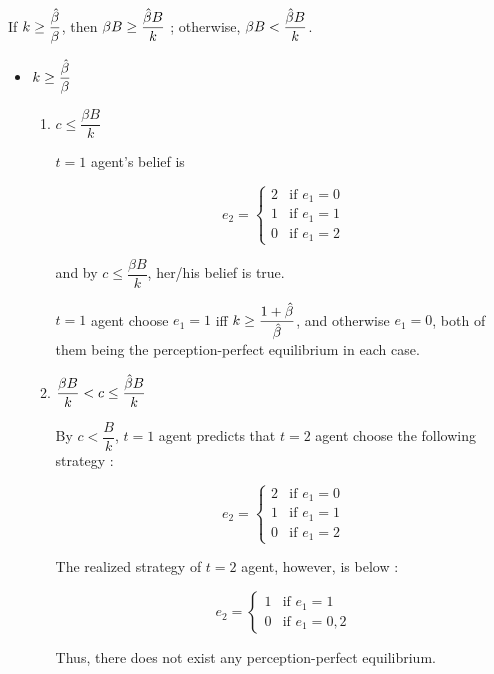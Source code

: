 \documentclass{jsarticle}
\begin{document}
\begin{enumerate}
\begin{enumerate}
\begin{center}
\end{center}

\vspace{1zw}

If $k \geq \dfrac{\Hat{\beta}}{\beta}$, then $\beta B \geq \dfrac{\Hat{\beta}B}{k}$ ; otherwise, $\beta B < \dfrac{\Hat{\beta}B}{k}$.

\newpage

 \begin{itemize}
 
 \item $k \geq \dfrac{\Hat{\beta}}{\beta}$
 
  \begin{enumerate}
  
  \item $c \leq \dfrac{\beta B}{k}$
  
 $t=1$ agent's belief is
 
 \[e_2 = \begin{cases}
 2 & \text{if } e_1=0 \\
 1 & \text{if } e_1=1 \\
 0 & \text{if } e_1=2
 \end{cases} \]
 
 and by $c \leq \dfrac{\beta B}{k}$, her/his belief is true.
 
 $t=1$ agent choose $e_1=1$ iff $ k \geq \dfrac{1+\Hat{\beta}}{\Hat{\beta}}$, and otherwise $e_1=0$, both of them being the perception-perfect equilibrium in each case.
  
  \item $\dfrac{\beta B}{k} < c \leq \dfrac{\Hat{\beta}B}{k}$
  
  By $c < \dfrac{B}{k}$, $t=1$ agent predicts that $t=2$ agent choose the following strategy :
 
 \[e_2 = \begin{cases}
 2 & \text{if } e_1=0 \\
 1 & \text{if } e_1=1 \\
 0 & \text{if } e_1=2
 \end{cases} \]
 
 The realized strategy of $t=2$ agent, however, is below :
 
 \[e_2 = \begin{cases}
  1 & \text{if } e_1=1 \\
 0 & \text{if } e_1=0,2
 \end{cases} \]
 
 Thus, there does not exist any perception-perfect equilibrium.
   

\end{enumerate}
\end{itemize}
\end{enumerate}
\end{enumerate}
\end{document}
